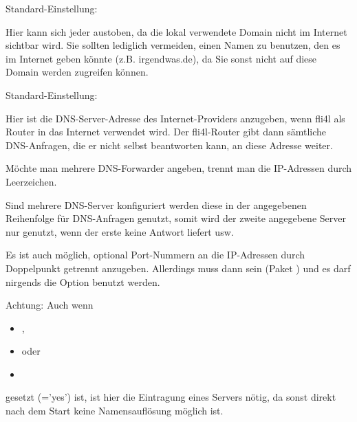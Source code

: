   \begin{description}

    
    Standard-Einstellung: 
    
    {Hier kann sich jeder austoben, da die lokal
      verwendete Domain nicht im Internet sichtbar wird.
      Sie sollten lediglich vermeiden, einen Namen zu benutzen, den es im
      Internet geben könnte (z.B. irgendwas.de), da Sie sonst nicht
      auf diese Domain werden zugreifen können.}


    
    Standard-Einstellung: 
    
    {Hier ist die DNS-Server-Adresse des Internet-Providers anzugeben,
      wenn fli4l als Router in das Internet verwendet wird. Der
      fli4l-Router gibt dann sämtliche DNS-Anfragen, die er nicht
      selbst beantworten kann, an diese Adresse weiter.

      Möchte man mehrere DNS-Forwarder angeben, trennt man die
      IP-Adressen durch Leerzeichen.

      Sind mehrere DNS-Server konfiguriert werden diese in der angegebenen 
      Reihenfolge für DNS-Anfragen genutzt, somit wird der zweite angegebene
      Server nur genutzt, wenn der erste keine Antwort liefert usw.

      Es ist auch möglich, optional Port-Nummern an die IP-Adressen durch
      Doppelpunkt getrennt anzugeben. Allerdings muss dann  sein (Paket
)
      und es darf nirgends die Option  benutzt werden.

      Achtung: Auch wenn
        \begin{itemize}
        \item {},
        \item {}
          oder
        \item {}
        \end{itemize}

        gesetzt (='yes') ist, ist hier die Eintragung eines Servers
        nötig, da sonst direkt nach dem Start keine Namensauflösung
        möglich ist.

}
\end{description}
